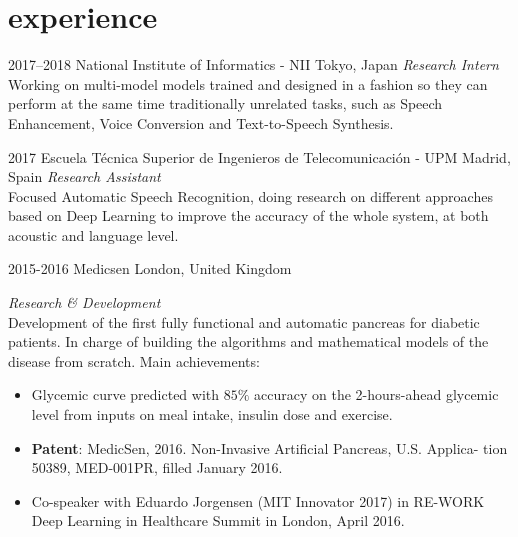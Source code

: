 \documentclass[]{friggeri-cv-a4}
\begin{document}
\section{experience}

\begin{entrylist}


\entry
{2017--2018}
{National Institute of Informatics - NII}
{Tokyo, Japan}
{\emph{Research Intern} \\
Working on multi-model models trained and designed in a fashion so they can perform at the same time traditionally unrelated tasks, such as Speech Enhancement, Voice Conversion and Text-to-Speech Synthesis.}

\end{entrylist}


\begin{entrylist}

\entry
{2017}
{Escuela Técnica Superior de Ingenieros de Telecomunicación - UPM}
{Madrid, Spain}
{\emph{Research Assistant} \\
Focused Automatic Speech Recognition, doing research on different approaches based on Deep Learning to improve the accuracy of the whole system, at both acoustic and language level.}


\end{entrylist}


\begin{entrylist}


\entry
{2015-2016}
{Medicsen}
{London, United Kingdom}
{\emph{Research \& Development} \\
Development of the first fully functional and automatic pancreas for diabetic patients. In charge of building the algorithms and mathematical models of the disease from scratch. Main achievements: 
\begin{itemize}
\item Glycemic curve predicted with $85\%$ accuracy on the 2-hours-ahead glycemic level from inputs on meal intake, insulin dose and exercise.
\item \textbf{Patent}: MedicSen, 2016. Non-Invasive Artificial Pancreas, U.S. Applica-
tion 50389, MED-001PR, filled January 2016.
\item Co-speaker with Eduardo Jorgensen (MIT Innovator 2017) in RE-WORK Deep Learning
in Healthcare Summit in London, April 2016.
\end{itemize}
}

\end{entrylist}
\end{document}
